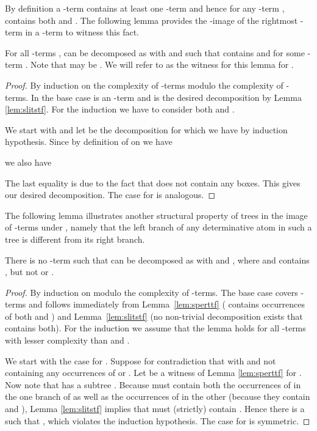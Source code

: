 By definition a -term contains at least one -term and hence for any
-term ,  contains both  and . The following lemma
provides the -image of the rightmost -term in a -term to witness
this fact.

\begin{lemma}[Determinativeness]
\label{lem:sperttf}
For all -terms ,  can be decomposed as  with  and  such that  contains  and  for
some -term . Note that  may be . We will refer to  as the
witness for this lemma for .
\end{lemma}
\begin{proof}
By induction on the complexity of -terms  modulo the complexity of
-terms. In the base case  is an -term and  is the desired decomposition by Lemma
\ref{lem:slitstf}. For the induction we have to consider both  and .

We start with  and let  be the
decomposition for  which we have by induction hypothesis. Since by
definition of  on  we have

we also have

The last equality is due to the fact that  does not contain any boxes.
This gives our desired decomposition. The case for  is
analogous.
\end{proof}

The following lemma illustrates another structural property of trees in the
image of -terms under , namely that the left branch of any
determinative atom in such a tree is different from its right branch.

\begin{lemma}
\label{lem:snondectf}
There is no -term  such that  can be decomposed as
 with  and , where  and 
contains , but not  or .
\end{lemma}
\begin{proof}
By induction on  modulo the complexity of -terms. The base case covers
-terms and follows immediately from Lemma~\ref{lem:sperttf} (
contains occurrences of both  and ) and Lemma~\ref{lem:slitstf}
(no non-trivial decomposition exists that contains both). For the induction we
assume that the lemma holds for all -terms with lesser complexity than  and .

We start with the case for . Suppose for contradiction that
 with  and  not containing
any occurrences of  or . Let  be a witness of Lemma
\ref{lem:sperttf} for . Now note that  has a subtree
. Because  must contain both the occurrences of
 in the one branch of  as well as the occurrences
of  in the other (because they contain  and ), Lemma
\ref{lem:slitstf} implies that  must (strictly) contain . Hence
there is a  such that , which violates the
induction hypothesis. The case for  is symmetric.
\end{proof}


